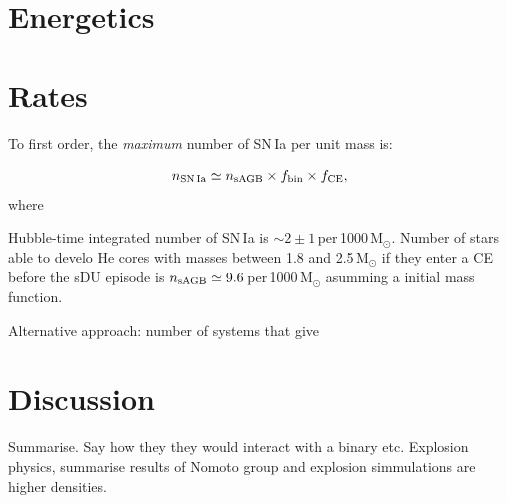 \documentclass[twocolumn,tighten,times]{aastex62}
\begin{document}
\section{Energetics}

\section{Rates}
To first order, the \emph{maximum} number of SN\,Ia per unit mass is:

\begin{equation}
n_{\rm SN\,Ia} \simeq n_{\rm sAGB}\times f_{\rm bin} \times f_{\rm CE},
\end{equation}
where 


Hubble-time integrated number of SN\,Ia is $\sim 2\pm 1$\,per\,1000\,M$_{\odot}$. 
Number of stars able to develo He cores with masses between 1.8 and 2.5\,M$_{\odot}$ if they enter a CE before the sDU episode is $n_{\rm sAGB}\simeq 9.6$\,per\,1000\,M$_{\odot}$ asumming a \cite{habrier:2004vw} initial mass function. 


Alternative approach: number of systems that give 
\section{Discussion}

Summarise. Say how they they would interact with a binary etc. Explosion physics, summarise results of Nomoto group and explosion simmulations are higher densities. 









\end{document}
